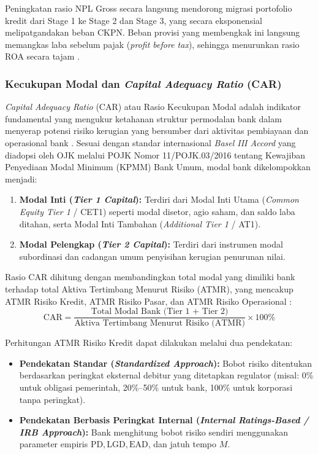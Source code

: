 \documentclass[12pt,a4paper]{article}
\numberwithin{equation}{section}
\begin{document}
\noindent
Peningkatan rasio NPL Gross secara langsung mendorong migrasi portofolio kredit dari Stage 1 ke Stage 2 dan Stage 3, yang secara eksponensial melipatgandakan beban CKPN. Beban provisi yang membengkak ini langsung memangkas laba sebelum pajak (\emph{profit before tax}), sehingga menurunkan rasio ROA secara tajam \citep{KuncoroSuhardjono2018, PraditaSyaichu2022}.

\subsubsection{Kecukupan Modal dan \emph{Capital Adequacy Ratio} (CAR)}
\noindent
\emph{Capital Adequacy Ratio} (CAR) atau Rasio Kecukupan Modal adalah indikator fundamental yang mengukur ketahanan struktur permodalan bank dalam menyerap potensi risiko kerugian yang bersumber dari aktivitas pembiayaan dan operasional bank \citep{BrighamEhrhardt2020}. Sesuai dengan standar internasional \emph{Basel III Accord} yang diadopsi oleh OJK melalui POJK Nomor 11/POJK.03/2016 tentang Kewajiban Penyediaan Modal Minimum (KPMM) Bank Umum, modal bank dikelompokkan menjadi:
\begin{enumerate}
  \item \textbf{Modal Inti (\emph{Tier 1 Capital}):} Terdiri dari Modal Inti Utama (\emph{Common Equity Tier 1} / CET1) seperti modal disetor, agio saham, dan saldo laba ditahan, serta Modal Inti Tambahan (\emph{Additional Tier 1} / AT1).
  \item \textbf{Modal Pelengkap (\emph{Tier 2 Capital}):} Terdiri dari instrumen modal subordinasi dan cadangan umum penyisihan kerugian penurunan nilai.
\end{enumerate}

\noindent
Rasio CAR dihitung dengan membandingkan total modal yang dimiliki bank terhadap total Aktiva Tertimbang Menurut Risiko (ATMR), yang mencakup ATMR Risiko Kredit, ATMR Risiko Pasar, dan ATMR Risiko Operasional \citep{Dendawijaya2015, HaryantoSudarno2023}:
\begin{equation}
  \text{CAR} = \frac{\text{Total Modal Bank (Tier 1 + Tier 2)}}{\text{Aktiva Tertimbang Menurut Risiko (ATMR)}} \times 100\%
\end{equation}

\noindent
Perhitungan ATMR Risiko Kredit dapat dilakukan melalui dua pendekatan:
\begin{itemize}
  \item \textbf{Pendekatan Standar (\emph{Standardized Approach}):} Bobot risiko ditentukan berdasarkan peringkat eksternal debitur yang ditetapkan regulator (misal: 0\% untuk obligasi pemerintah, 20\%--50\% untuk bank, 100\% untuk korporasi tanpa peringkat).
  \item \textbf{Pendekatan Berbasis Peringkat Internal (\emph{Internal Ratings-Based / IRB Approach}):} Bank menghitung bobot risiko sendiri menggunakan parameter empiris $\text{PD}, \text{LGD}, \text{EAD}$, dan jatuh tempo $M$.
\end{itemize}
\end{document}
